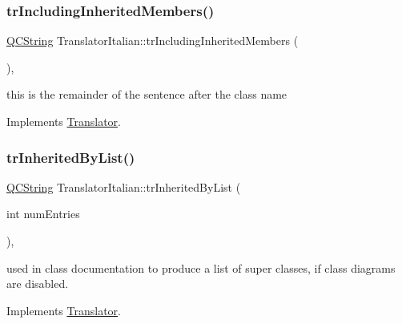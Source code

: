 \mbox{\label{class_translator_italian_ac3f003e5c0bbf155e120662d20888800}} 
\subsubsection{\texorpdfstring{trIncludingInheritedMembers()}{trIncludingInheritedMembers()}}
{\footnotesize\ttfamily \mbox{\hyperlink{class_q_c_string}{Q\+C\+String}} Translator\+Italian\+::tr\+Including\+Inherited\+Members (\begin{DoxyParamCaption}{ }\end{DoxyParamCaption})\hspace{0.3cm}{\ttfamily [inline]}, {\ttfamily [virtual]}}

this is the remainder of the sentence after the class name 

Implements \mbox{\hyperlink{class_translator}{Translator}}.

\mbox{\label{class_translator_italian_abd0a16c41457edd554440632a8950f95}} 
\subsubsection{\texorpdfstring{trInheritedByList()}{trInheritedByList()}}
{\footnotesize\ttfamily \mbox{\hyperlink{class_q_c_string}{Q\+C\+String}} Translator\+Italian\+::tr\+Inherited\+By\+List (\begin{DoxyParamCaption}\item[{int}]{num\+Entries }\end{DoxyParamCaption})\hspace{0.3cm}{\ttfamily [inline]}, {\ttfamily [virtual]}}

used in class documentation to produce a list of super classes, if class diagrams are disabled. 

Implements \mbox{\hyperlink{class_translator}{Translator}}.

\mbox{\label{class_translator_italian_a1273a94f19d2d30d84f5ca52022bea84}} 
